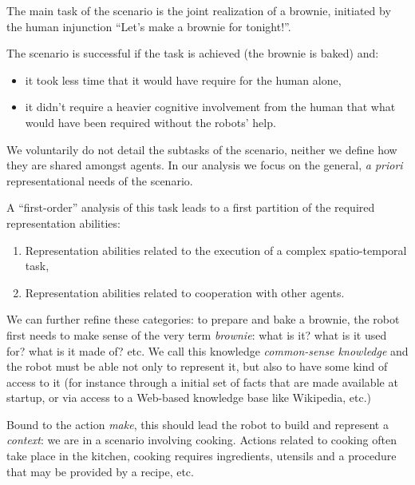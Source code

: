 The main task of the scenario is the joint realization of a brownie, initiated
by the human injunction ``Let's make a brownie for tonight!''.

The scenario is successful if the task is achieved (the brownie is baked) and:

\begin{itemize} 

	\item it took less time that it would have require for the human alone, 

	\item it didn't require a heavier cognitive involvement from the human that
	what would have been required without the robots' help.  

\end{itemize}

We voluntarily do not detail the subtasks of the scenario, neither we define
how they are shared amongst agents. In our analysis we focus on the general,
\textit{a priori} representational needs of the scenario.

A ``first-order'' analysis of this task leads to a first partition of the
required representation abilities:

\begin{enumerate}

	\item Representation abilities related to the execution of a complex
	spatio-temporal task,

	\item Representation abilities related to cooperation with other agents.

\end{enumerate}

We can further refine these categories: to prepare and bake a brownie, the
robot first needs to make sense of the very term \emph{brownie}: what is it?
what is it used for? what is it made of? etc. We call this knowledge
\emph{common-sense knowledge} and the robot must be able not only to represent
it, but also to have some kind of access to it (for instance through a initial
set of facts that are made available at startup, or via access to a Web-based
knowledge base like Wikipedia, etc.)

Bound to the action \emph{make}, this should lead the robot to build and
represent a \emph{context}: we are in a scenario involving cooking. Actions
related to cooking often take place in the kitchen, cooking requires ingredients, 
utensils and a procedure that may be provided by a recipe, etc.

